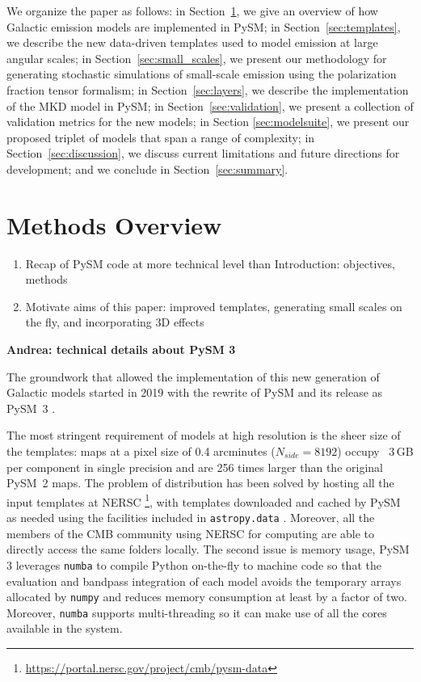 \documentclass[twocolumn]{aastex631}
\begin{document}
We organize the paper as follows: in Section~\ref{sec:methods}, we give an overview of how Galactic emission models are implemented in PySM; in Section~\ref{sec:templates}, we describe the new data-driven templates used to model emission at large angular scales; in Section~\ref{sec:small_scales}, we present our methodology for generating stochastic simulations of small-scale emission using the polarization fraction tensor formalism; in Section~\ref{sec:layers}, we describe the implementation of the MKD model in PySM; in Section~\ref{sec:validation}, we present a collection of validation metrics for the new models; in Section \ref{sec:modelsuite}, we present our proposed triplet of models that span a range of complexity; in Section~\ref{sec:discussion}, we discuss current limitations and future directions for development; and we conclude in Section~\ref{sec:summary}.

\section{Methods Overview} \label{sec:methods}

\begin{enumerate}
    \item Recap of PySM code at more technical level than Introduction: objectives, methods
    \item Motivate aims of this paper: improved templates, generating small scales on the fly, and incorporating 3D effects
\end{enumerate}

\textbf{Andrea: technical details about PySM 3}

The groundwork that allowed the implementation of this new generation of Galactic models started in 2019 with the rewrite of PySM and its release as PySM~3 \citep[see][for details]{Zonca:2021}.

The most stringent requirement of models at high resolution is the sheer size of the templates: maps at a pixel size of 0.4 arcminutes ($N_{side}=8192$) occupy ~3\,GB per component in single precision and are 256 times larger than the original PySM~2 maps. The problem of distribution has been solved by hosting all the input templates at NERSC \footnote{\url{https://portal.nersc.gov/project/cmb/pysm-data}}, with templates downloaded and cached by PySM as needed using the facilities included in \texttt{astropy.data} \citep{AstropyCollaboration:2013, AstropyCollaboration:2018}. Moreover, all the members of the CMB community using NERSC for computing are able to directly access the same folders locally. The second issue is memory usage, PySM 3 leverages \texttt{numba} \citep{numba:2015} to compile Python on-the-fly to machine code so that the evaluation and bandpass integration of each model avoids the temporary arrays allocated by \texttt{numpy} and reduces memory consumption at least by a factor of two. Moreover, \texttt{numba} supports multi-threading so it can make use of all the cores available in the system.
\end{document}
